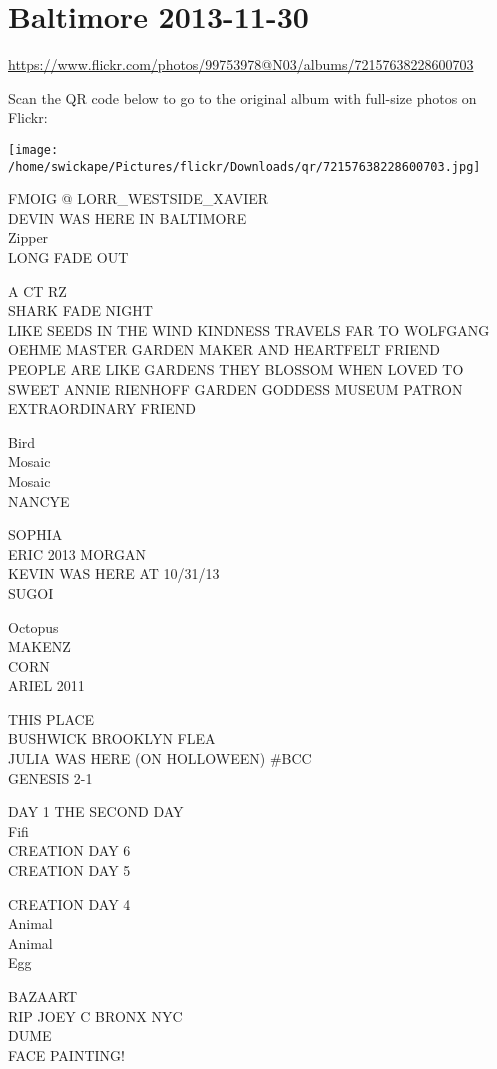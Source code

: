 \documentclass[10pt,letterpaper]{article}
\begin{document}
\section*{Baltimore 2013-11-30}

\url{https://www.flickr.com/photos/99753978@N03/albums/72157638228600703}

Scan the QR code below to go to the original album with full-size photos on Flickr:

\texttt{[image: /home/swickape/Pictures/flickr/Downloads/qr/72157638228600703.jpg]}


FMOIG @ LORR\_WESTSIDE\_XAVIER\\
DEVIN WAS HERE IN BALTIMORE\\
Zipper\\
LONG FADE OUT

A CT RZ\\
SHARK FADE NIGHT\\
LIKE SEEDS IN THE WIND KINDNESS TRAVELS FAR TO WOLFGANG OEHME MASTER GARDEN MAKER AND HEARTFELT FRIEND\\
PEOPLE ARE LIKE GARDENS THEY BLOSSOM WHEN LOVED TO SWEET ANNIE RIENHOFF GARDEN GODDESS MUSEUM PATRON EXTRAORDINARY FRIEND

Bird\\
Mosaic\\
Mosaic\\
NANCYE

SOPHIA\\
ERIC 2013 MORGAN\\
KEVIN WAS HERE AT 10/31/13\\
SUGOI

Octopus\\
MAKENZ\\
CORN\\
ARIEL 2011

THIS PLACE\\
BUSHWICK BROOKLYN FLEA\\
JULIA WAS HERE (ON HOLLOWEEN) \#BCC\\
GENESIS 2{-}1

DAY 1 THE SECOND DAY\\
Fifi\\
CREATION DAY 6\\
CREATION DAY 5

CREATION DAY 4\\
Animal\\
Animal\\
Egg

BAZAART\\
RIP JOEY C BRONX NYC\\
DUME\\
FACE PAINTING!
\end{document}
